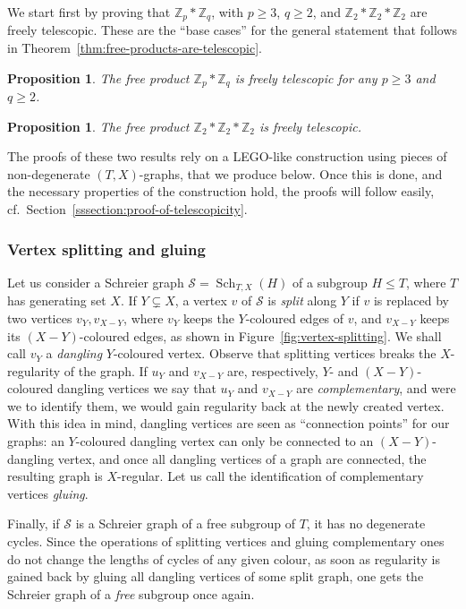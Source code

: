 \documentclass[10pt,a4paper]{amsart}
\newcommand{\cf}{cf.\ }
\newtheorem{prop}[theo]{Proposition}
\theoremstyle{definition}
\newcommand{\ZZ}{\mathbb{Z}}
\newcommand{\cS}{\mathcal{S}}
\DeclareMathOperator{\Sch}{Sch}
\begin{document}
We start first by proving that $\ZZ_p*\ZZ_q$, with $p \geq 3$, $q \geq 2$, and $\ZZ_2*\ZZ_2*\ZZ_2$ are freely telescopic. These are the ``base cases'' for the general statement that follows in Theorem~\ref{thm:free-products-are-telescopic}.

\begin{prop}\label{prop:ZpZq-telescopic}
The free product $\ZZ_p \ast \ZZ_q$ is freely telescopic for any $p \geq 3$ and $q \geq 2$.
\end{prop}

\begin{prop}\label{prop:Z2Z2Z2-telescopic}
The free product $\ZZ_2 \ast \ZZ_2 \ast \ZZ_2$ is freely telescopic.
\end{prop}

The proofs of these two results rely on a LEGO-like construction using pieces of non-degenerate $(T,X)$-graphs, that we produce below.
Once this is done, and the necessary properties of the construction hold, the proofs will follow easily, %
\cf Section~\ref{sssection:proof-of-telescopicity}.


\subsubsection{Vertex splitting and gluing}
Let us consider a Schreier graph $\cS = \Sch_{T,X}(H)$ of a subgroup $H \leq T$, where $T$ has generating set $X$. If $Y \subsetneq X$, a vertex $v$ of $\cS$ is \emph{split} along $Y$ if $v$ is replaced by two vertices $v_Y,v_{X-Y}$, where $v_Y$ keeps the $Y$-coloured edges of $v$, and $v_{X-Y}$ keeps its $(X-Y)$-coloured edges, as shown in Figure~\ref{fig:vertex-splitting}. We shall call $v_Y$ a \emph{dangling} $Y$-coloured vertex. Observe that splitting vertices breaks the $X$-regularity of the graph. If $u_Y$ and $v_{X-Y}$ are, respectively, $Y$- and $(X-Y)$-coloured dangling vertices we say that $u_Y$ and $v_{X-Y}$ are \emph{complementary}, and were we to identify them, we would gain regularity back at the newly created vertex. With this idea in mind, dangling vertices are seen as ``connection points'' for our graphs: an $Y$-coloured dangling vertex can only be connected to an $(X-Y)$-dangling vertex, and once all dangling vertices of a graph are connected, the resulting graph is $X$-regular. Let us call the identification of complementary vertices \emph{gluing}.

Finally, if $\cS$ is a Schreier graph of a free subgroup of $T$, it has no degenerate cycles. Since the operations of splitting vertices and gluing complementary ones do not change the lengths of cycles of any given colour, as soon as regularity is gained back by gluing all dangling vertices of some split graph, one gets the Schreier graph of a \emph{free} subgroup once again.
\end{document}

